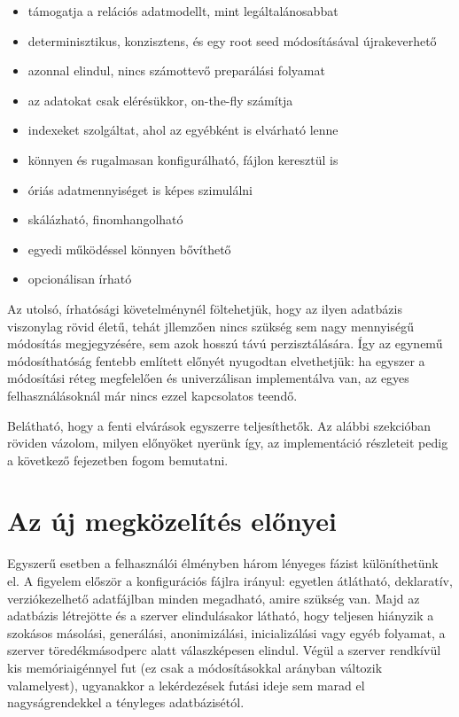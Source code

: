 \documentclass[
    parspace,
    noindent,
    nohyp,
]{elteiktdk}[2023/04/10]
\begin{document}
\begin{itemize}
    \item támogatja a relációs adatmodellt, mint legáltalánosabbat
    \item determinisztikus, konzisztens, és egy root seed módosításával újrakeverhető
    \item azonnal elindul, nincs számottevő preparálási folyamat
    \item az adatokat csak elérésükkor, on-the-fly számítja
    \item indexeket szolgáltat, ahol az egyébként is elvárható lenne
    \item könnyen és rugalmasan konfigurálható, fájlon keresztül is
    \item óriás adatmennyiséget is képes szimulálni
    \item skálázható, finomhangolható
    \item egyedi működéssel könnyen bővíthető
    \item opcionálisan írható
\end{itemize}

Az utolsó, írhatósági követelménynél föltehetjük, hogy az ilyen adatbázis viszonylag rövid életű,
tehát jllemzően nincs szükség sem nagy mennyiségű módosítás megjegyzésére,
sem azok hosszú távú perzisztálására.
Így az egynemű módosíthatóság fentebb említett előnyét nyugodtan elvethetjük:
ha egyszer a módosítási réteg megfelelően és univerzálisan implementálva van,
az egyes felhasználásoknál már nincs ezzel kapcsolatos teendő.

Belátható, hogy a fenti elvárások egyszerre teljesíthetők.
Az alábbi szekcióban röviden vázolom, milyen előnyöket nyerünk így,
az implementáció részleteit pedig a következő fejezetben fogom bemutatni.

\section{Az új megközelítés előnyei}

Egyszerű esetben a felhasználói élményben három lényeges fázist különíthetünk el.
A figyelem először a konfigurációs fájlra irányul:
egyetlen átlátható, deklaratív, verziókezelhető adatfájlban minden megadható, amire szükség van.
Majd az adatbázis létrejötte és a szerver elindulásakor látható,
hogy teljesen hiányzik a szokásos másolási, generálási, anonimizálási, inicializálási vagy egyéb folyamat,
a szerver töredékmásodperc alatt válaszképesen elindul.
Végül a szerver rendkívül kis memóriaigénnyel fut
(ez csak a módosításokkal arányban változik valamelyest),
ugyanakkor a lekérdezések futási ideje sem marad el nagyságrendekkel a tényleges adatbázisétól.
\end{document}
